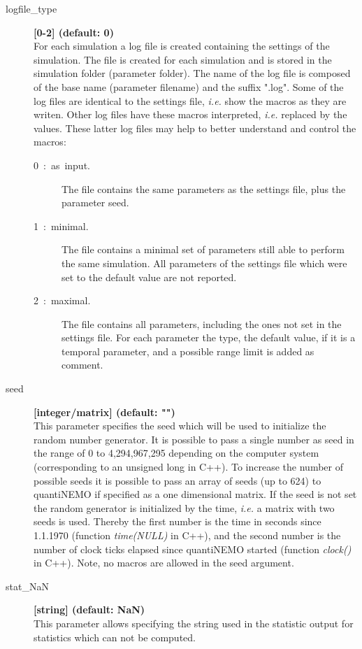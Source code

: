 \documentclass[letterpaper,12pt,oneside]{book}
\begin{document}
\begin{description}
\item[logfile\_type] \textbf{[0-2] (default: 0)}\\
For each simulation a log file is created containing the settings of the simulation. The file is created for each simulation and is stored in the simulation folder (parameter \textsf{folder}). The name of the log file is composed of the base name (parameter \textsf{filename}) and the suffix ".log". Some of the log files are identical to the settings file, \textit{i.e.} show the macros as they are writen. Other log files have these macros interpreted, \textit{i.e.} replaced by the values. These latter log files may help to better understand and control the macros:
\begin{description}
\item[0~:~as~input.] The file contains the same parameters as the settings file, plus the parameter \textsf{seed}.
\item[1~:~minimal.] The file contains a minimal set of parameters still able to perform the same simulation. All parameters of the settings file which were set to the default value are not reported. 
\item[2~:~maximal.] The file contains all parameters, including the ones not set in the settings file. For each parameter the type, the default value, if it is a temporal parameter, and a possible range limit is added as comment.
\end{description}

\item[seed] \textbf{[integer/matrix] (default: "")}\\
This parameter specifies the seed which will be used to initialize the random number generator. It is possible to pass a single number as seed in the range of 0 to 4,294,967,295 depending on the computer system (corresponding to an unsigned long in C++). To increase the number of possible seeds it is possible to pass an array of seeds (up to 624) to quantiNEMO if specified as a one dimensional matrix. If the seed is not set the random generator is initialized by the time, \textit{i.e.} a matrix with two seeds is used. Thereby the first number is the time in seconds since 1.1.1970 (function \textit{time(NULL)} in C++), and the second number is the number of clock ticks elapsed since quantiNEMO started (function \textit{clock()} in C++). Note, no macros are allowed in the seed argument.\\


\item[stat\_NaN] \textbf{[string] (default: NaN)}\\
This parameter allows specifying the string used in the statistic output for statistics which can not be computed.


\end{description}
\end{document}
